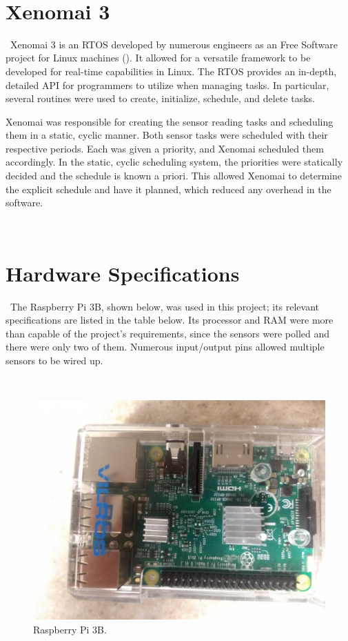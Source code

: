 \documentclass[letterpaper, 12pt]{article}
\begin{document}
~\newpage

\section{Xenomai 3}

~\indent Xenomai 3 is an RTOS developed by numerous engineers as an Free Software project for Linux machines (\cite{xenomai2018}).  It allowed for a versatile framework to be developed for real-time capabilities in Linux.  The RTOS provides an in-depth, detailed API for programmers to utilize when managing tasks.  In particular, several routines were used to create, initialize, schedule, and delete tasks.

\indent Xenomai was responsible for creating the sensor reading tasks and scheduling them in a static, cyclic manner.  Both sensor tasks were scheduled with their respective periods.  Each was given a priority, and Xenomai scheduled them accordingly.  In the static, cyclic scheduling system, the priorities were statically decided and the schedule is known a priori.  This allowed Xenomai to determine the explicit schedule and have it planned, which reduced any overhead in the software.

~\newpage

\section{Hardware Specifications}

~\indent The Raspberry Pi 3B, shown below, was used in this project; its relevant specifications are listed in the table below.  Its processor and RAM were more than capable of the project's requirements, since the sensors were polled and there were only two of them.  Numerous input/output pins allowed multiple sensors to be wired up.

~\newline 
\begin{figure}[H]
	\centering
	\includegraphics[width=12cm,keepaspectratio]{raspberry_pi.jpg}
	\caption[RPi]{Raspberry Pi 3B.}
	\label{fig:rpi}
\end{figure}
\end{document}
